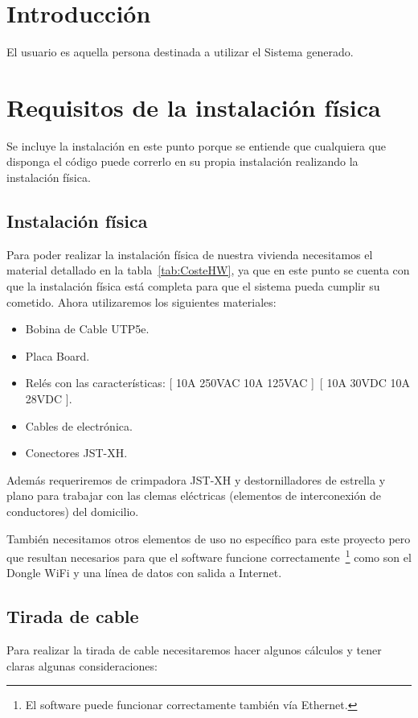 
\section{Introducción}
El usuario es aquella persona destinada a utilizar el Sistema generado.

\section{Requisitos de la instalación física}
Se incluye la instalación en este punto porque se entiende que cualquiera que disponga el código puede correrlo en su propia instalación realizando la instalación física.

\subsection{Instalación física}
Para poder realizar la instalación física de nuestra vivienda necesitamos el material detallado en la tabla~\ref{tab:CosteHW}, ya que en este punto se cuenta con que la instalación física está completa para que el sistema pueda cumplir su cometido. Ahora utilizaremos los siguientes materiales:
\begin{itemize}
    \item Bobina de Cable UTP5e.
    \item Placa Board.
    \item Relés con las características: [ 10A 250VAC 10A 125VAC ]~[ 10A 30VDC 10A 28VDC ].
    \item Cables de electrónica.
    \item Conectores JST-XH.
\end{itemize}

Además requeriremos de crimpadora JST-XH y destornilladores de estrella y plano para trabajar con las clemas eléctricas (elementos de interconexión de conductores) del domicilio.

También necesitamos otros elementos de uso no específico para este proyecto pero que resultan necesarios para que el software funcione correctamente~\footnote{El software puede funcionar correctamente también vía Ethernet.} como son el Dongle WiFi y una línea de datos con salida a Internet.

\subsection{Tirada de cable}
Para realizar la tirada de cable necesitaremos hacer algunos cálculos y tener claras algunas consideraciones:

